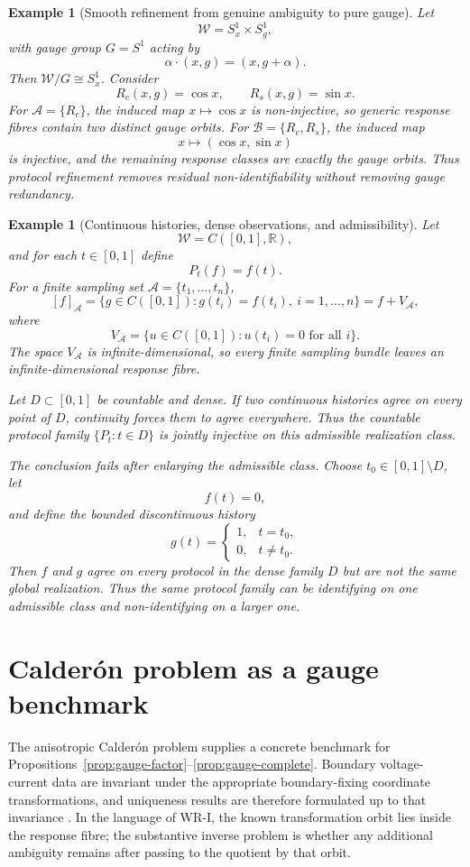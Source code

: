 \documentclass[11pt]{article}
\newtheorem{example}[definition]{Example}
\newcommand{\W}{\mathcal W}
\newcommand{\Acal}{\mathcal A}
\newcommand{\Bcal}{\mathcal B}
\begin{document}
\begin{example}[Smooth refinement from genuine ambiguity to pure gauge]
Let
\[
\W=S^1_x\times S^1_g,
\]
with gauge group $G=S^1$ acting by
\[
\alpha\cdot(x,g)=(x,g+\alpha).
\]
Then $\W/G\cong S^1_x$. Consider
\[
R_c(x,g)=\cos x,
\qquad
R_s(x,g)=\sin x.
\]
For $\Acal=\{R_c\}$, the induced map
$x\mapsto\cos x$ is non-injective, so generic response fibres contain two
distinct gauge orbits. For
$\Bcal=\{R_c,R_s\}$, the induced map
\[
x\mapsto(\cos x,\sin x)
\]
is injective, and the remaining response classes are exactly the gauge orbits.
Thus protocol refinement removes residual non-identifiability without removing
gauge redundancy.
\end{example}

\begin{example}[Continuous histories, dense observations, and admissibility]
Let
\[
\W=C([0,1],\mathbb R),
\]
and for each $t\in[0,1]$ define
\[
P_t(f)=f(t).
\]
For a finite sampling set $\Acal=\{t_1,\ldots,t_n\}$,
\[
[f]_{\Acal}
=
\{g\in C([0,1]):g(t_i)=f(t_i),\ i=1,\ldots,n\}
=
f+V_{\Acal},
\]
where
\[
V_{\Acal}
=
\{u\in C([0,1]):u(t_i)=0\text{ for all }i\}.
\]
The space $V_{\Acal}$ is infinite-dimensional, so every finite sampling bundle
leaves an infinite-dimensional response fibre.

Let $D\subset[0,1]$ be countable and dense. If two continuous histories agree
on every point of $D$, continuity forces them to agree everywhere. Thus the
countable protocol family $\{P_t:t\in D\}$ is jointly injective on this
admissible realization class.

The conclusion fails after enlarging the admissible class. Choose
$t_0\in[0,1]\setminus D$, let
\[
f(t)=0,
\]
and define the bounded discontinuous history
\[
g(t)=
\begin{cases}
1,&t=t_0,\\
0,&t\neq t_0.
\end{cases}
\]
Then $f$ and $g$ agree on every protocol in the dense family $D$ but are not the
same global realization. Thus the same protocol family can be identifying on
one admissible class and non-identifying on a larger one.
\end{example}

\section{Calder\'on problem as a gauge benchmark}

The anisotropic Calder\'on problem supplies a concrete benchmark for
Propositions~\ref{prop:gauge-factor}--\ref{prop:gauge-complete}. Boundary
voltage-current data are invariant under the appropriate boundary-fixing
coordinate transformations, and uniqueness results are therefore formulated
up to that invariance \cite{LassasLiimatainenSalo2020}. In the language of
WR-I, the known transformation orbit lies inside the response fibre; the
substantive inverse problem is whether any additional ambiguity remains after
passing to the quotient by that orbit.
\end{document}
